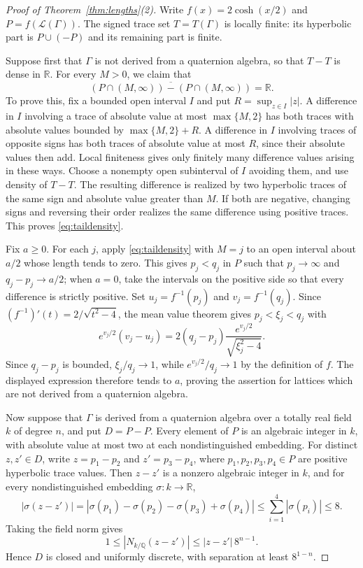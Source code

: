 \documentclass[reqno]{amsart}
\theoremstyle{remark}
\newcommand{\R}{\mathbb R}
\newcommand{\Q}{\mathbb Q}
\begin{document}
\begin{proof}[Proof of Theorem~\ref{thm:lengths}(2)]
Write $f(x)=2\cosh(x/2)$ and $P=f(\mathcal L(\Gamma))$. The signed trace set $T=T(\Gamma)$ is locally finite: its hyperbolic part is $P\cup(-P)$ and its remaining part is finite.

Suppose first that $\Gamma$ is not derived from a quaternion algebra, so that $T-T$ is dense in $\R$. For every $M>0$, we claim that
\begin{equation}\label{eq:taildensity}
\overline{(P\cap(M,\infty))-(P\cap(M,\infty))}=\R.
\end{equation}
To prove this, fix a bounded open interval $I$ and put $R=\sup_{z\in I}|z|$. A difference in $I$ involving a trace of absolute value at most $\max\{M,2\}$ has both traces with absolute values bounded by $\max\{M,2\}+R$. A difference in $I$ involving traces of opposite signs has both traces of absolute value at most $R$, since their absolute values then add. Local finiteness gives only finitely many difference values arising in these ways. Choose a nonempty open subinterval of $I$ avoiding them, and use density of $T-T$. The resulting difference is realized by two hyperbolic traces of the same sign and absolute value greater than $M$. If both are negative, changing signs and reversing their order realizes the same difference using positive traces. This proves \eqref{eq:taildensity}.

Fix $a\ge0$. For each $j$, apply \eqref{eq:taildensity} with $M=j$ to an open interval about $a/2$ whose length tends to zero. This gives $p_j<q_j$ in $P$ such that $p_j\to\infty$ and $q_j-p_j\to a/2$; when $a=0$, take the intervals on the positive side so that every difference is strictly positive. Set $u_j=f^{-1}(p_j)$ and $v_j=f^{-1}(q_j)$. Since $(f^{-1})'(t)=2/\sqrt{t^2-4}$, the mean value theorem gives $p_j<\xi_j<q_j$ with
$$
e^{v_j/2}(v_j-u_j)
=2(q_j-p_j)\frac{e^{v_j/2}}{\sqrt{\xi_j^2-4}}.
$$
Since $q_j-p_j$ is bounded, $\xi_j/q_j\to1$, while $e^{v_j/2}/q_j\to1$ by the definition of $f$. The displayed expression therefore tends to $a$, proving the assertion for lattices which are not derived from a quaternion algebra.

Now suppose that $\Gamma$ is derived from a quaternion algebra over a totally real field $k$ of degree $n$, and put $D=P-P$. Every element of $P$ is an algebraic integer in $k$, with absolute value at most two at each nondistinguished embedding. For distinct $z,z'\in D$, write $z=p_1-p_2$ and $z'=p_3-p_4$, where $p_1,p_2,p_3,p_4\in P$ are positive hyperbolic trace values. Then $z-z'$ is a nonzero algebraic integer in $k$, and for every nondistinguished embedding $\sigma:k\to\mathbb R$,
$$
|\sigma(z-z')|=|\sigma(p_1)-\sigma(p_2)-\sigma(p_3)+\sigma(p_4)|\le \sum_{i=1}^4|\sigma(p_i)|\le 8.
$$
Taking the field norm gives
$$
1\le |N_{k/\Q}(z-z')|\le |z-z'|\,8^{n-1}.
$$
Hence $D$ is closed and uniformly discrete, with separation at least $8^{1-n}$.


\end{proof}
\end{document}
